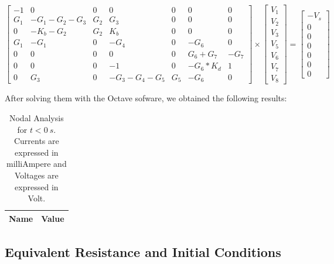 \begin{equation}
\begin{bmatrix}
	-1	&	0	&	0	&	0	&	0	&	0	&	0 \\
	G_1	&	-G_1 - G_2 - G_3	&	G_2	&	G_3	&	0	&	0	&	0 \\
	0	&	-K_b - G_2	&	G_2	&	K_b	&	0	&	0	&	0 \\
	G_1	&	-G_1	&	0	&	-G_4	&	0	&	-G_6	&	0 \\
	0	&	0	&	0	&	0	&	0	&	G_6 + G_7	&	-G_7 \\
	0	&	0	&	0	&	-1	&	0	&	-G_6 *	K_d	&	1 \\
	0	&	G_3	&	0	&	-G_3 - G_4 - G_5	&	G_5	&	-G_6	&	0
\end{bmatrix}
\times
\begin{bmatrix}
	V_1 \\
	V_2 \\
	V_3 \\
	V_5 \\
	V_6 \\
	V_7 \\
	V_8
\end{bmatrix}
=
\begin{bmatrix}
	-V_s \\
	0 \\
	0 \\
	0 \\
	0 \\
	0 \\
	0
	\label{m:1}
\end{bmatrix}
\end{equation}

After solving them with the Octave sofware, we obtained the following results:

\clearpage

\begin{table}[h]
  \centering
  \begin{tabular}{|l|r|}
    \hline
    {\bf Name} & {\bf Value} \\ \hline
    
  \end{tabular}
  \caption{Nodal Analysis for $t<0~s$. Currents are expressed in milliAmpere and Voltages are expressed in Volt.}                                                            
  \label{tab:theoretical1}                                                      
\end{table}   



\subsection{Equivalent Resistance and Initial Conditions}



